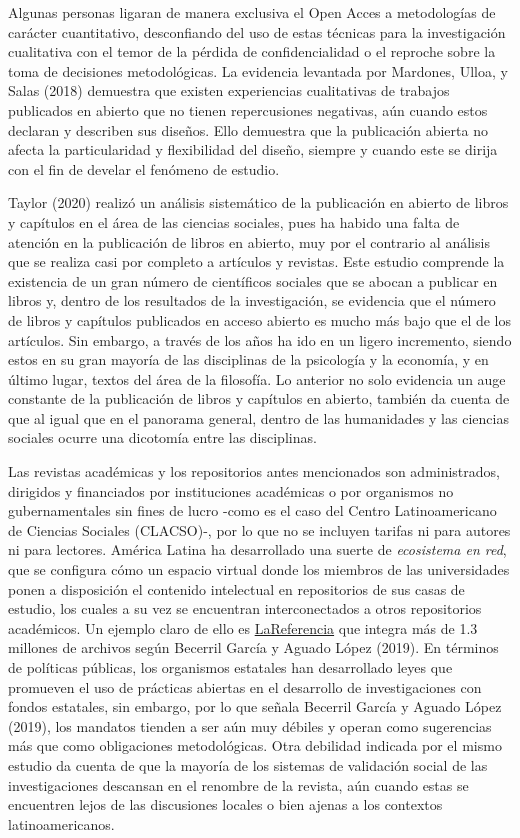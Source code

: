 \documentclass[
  spanish,
  letterpaper,
  DIV=11,
  numbers=noendperiod]{scrreprt}
\begin{document}
Algunas personas ligaran de manera exclusiva el Open Acces a
metodologías de carácter cuantitativo, desconfiando del uso de estas
técnicas para la investigación cualitativa con el temor de la pérdida de
confidencialidad o el reproche sobre la toma de decisiones
metodológicas. La evidencia levantada por Mardones, Ulloa, y Salas
(2018) demuestra que existen experiencias cualitativas de trabajos
publicados en abierto que no tienen repercusiones negativas, aún cuando
estos declaran y describen sus diseños. Ello demuestra que la
publicación abierta no afecta la particularidad y flexibilidad del
diseño, siempre y cuando este se dirija con el fin de develar el
fenómeno de estudio.

Taylor (2020) realizó un análisis sistemático de la publicación en
abierto de libros y capítulos en el área de las ciencias sociales, pues
ha habido una falta de atención en la publicación de libros en abierto,
muy por el contrario al análisis que se realiza casi por completo a
artículos y revistas. Este estudio comprende la existencia de un gran
número de científicos sociales que se abocan a publicar en libros y,
dentro de los resultados de la investigación, se evidencia que el número
de libros y capítulos publicados en acceso abierto es mucho más bajo que
el de los artículos. Sin embargo, a través de los años ha ido en un
ligero incremento, siendo estos en su gran mayoría de las disciplinas de
la psicología y la economía, y en último lugar, textos del área de la
filosofía. Lo anterior no solo evidencia un auge constante de la
publicación de libros y capítulos en abierto, también da cuenta de que
al igual que en el panorama general, dentro de las humanidades y las
ciencias sociales ocurre una dicotomía entre las disciplinas.

Las revistas académicas y los repositorios antes mencionados son
administrados, dirigidos y financiados por instituciones académicas o
por organismos no gubernamentales sin fines de lucro -como es el caso
del Centro Latinoamericano de Ciencias Sociales (CLACSO)-, por lo que no
se incluyen tarifas ni para autores ni para lectores. América Latina ha
desarrollado una suerte de \emph{ecosistema en red}, que se configura
cómo un espacio virtual donde los miembros de las universidades ponen a
disposición el contenido intelectual en repositorios de sus casas de
estudio, los cuales a su vez se encuentran interconectados a otros
repositorios académicos. Un ejemplo claro de ello es
\href{https://www.lareferencia.info/es/}{LaReferencia} que integra más
de 1.3 millones de archivos según Becerril García y Aguado López (2019).
En términos de políticas públicas, los organismos estatales han
desarrollado leyes que promueven el uso de prácticas abiertas en el
desarrollo de investigaciones con fondos estatales, sin embargo, por lo
que señala Becerril García y Aguado López (2019), los mandatos tienden a
ser aún muy débiles y operan como sugerencias más que como obligaciones
metodológicas. Otra debilidad indicada por el mismo estudio da cuenta de
que la mayoría de los sistemas de validación social de las
investigaciones descansan en el renombre de la revista, aún cuando estas
se encuentren lejos de las discusiones locales o bien ajenas a los
contextos latinoamericanos.
\end{document}
